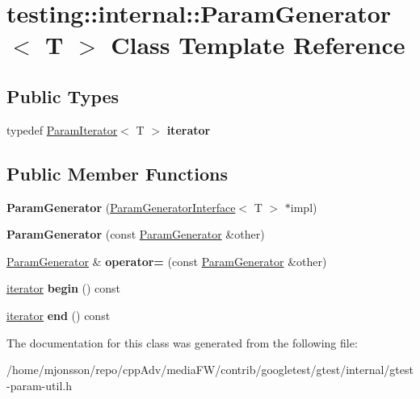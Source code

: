 \hypertarget{classtesting_1_1internal_1_1ParamGenerator}{}\section{testing\+:\+:internal\+:\+:Param\+Generator$<$ T $>$ Class Template Reference}
\label{classtesting_1_1internal_1_1ParamGenerator}
\subsection*{Public Types}
\begin{DoxyCompactItemize}
\item 
\mbox{\label{classtesting_1_1internal_1_1ParamGenerator_a448b08a8eaae1f1d27840d4dbd66c357}} 
typedef \hyperlink{classtesting_1_1internal_1_1ParamIterator}{Param\+Iterator}$<$ T $>$ {\bfseries iterator}
\end{DoxyCompactItemize}
\subsection*{Public Member Functions}
\begin{DoxyCompactItemize}
\item 
\mbox{\label{classtesting_1_1internal_1_1ParamGenerator_a6b017d4d030927714d495ee95ae92fbc}} 
{\bfseries Param\+Generator} (\hyperlink{classtesting_1_1internal_1_1ParamGeneratorInterface}{Param\+Generator\+Interface}$<$ T $>$ $\ast$impl)
\item 
\mbox{\label{classtesting_1_1internal_1_1ParamGenerator_a5891d25c31919b3099489f8bbcd58b5e}} 
{\bfseries Param\+Generator} (const \hyperlink{classtesting_1_1internal_1_1ParamGenerator}{Param\+Generator} \&other)
\item 
\mbox{\label{classtesting_1_1internal_1_1ParamGenerator_a590a03c6e0a3a3ac6279943ad1f01dc8}} 
\hyperlink{classtesting_1_1internal_1_1ParamGenerator}{Param\+Generator} \& {\bfseries operator=} (const \hyperlink{classtesting_1_1internal_1_1ParamGenerator}{Param\+Generator} \&other)
\item 
\mbox{\label{classtesting_1_1internal_1_1ParamGenerator_a14e735c8bd113556ae905a560cd2d607}} 
\hyperlink{classtesting_1_1internal_1_1ParamIterator}{iterator} {\bfseries begin} () const
\item 
\mbox{\label{classtesting_1_1internal_1_1ParamGenerator_aaf8f75df1099a07ff771a550b48f9fbe}} 
\hyperlink{classtesting_1_1internal_1_1ParamIterator}{iterator} {\bfseries end} () const
\end{DoxyCompactItemize}


The documentation for this class was generated from the following file\+:\begin{DoxyCompactItemize}
\item 
/home/mjonsson/repo/cpp\+Adv/media\+F\+W/contrib/googletest/gtest/internal/gtest-\/param-\/util.\+h\end{DoxyCompactItemize}
